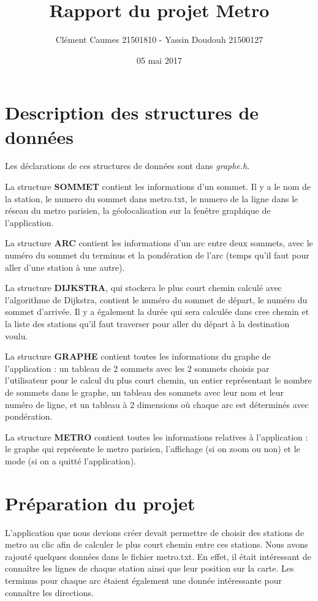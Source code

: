 \documentclass[a4]{article}
\author{Clément Caumes 21501810 - Yassin Doudouh 21500127}
\title{Rapport du projet Metro}
\date{05 mai 2017}
\begin{document}
\maketitle

\section{Description des structures de données}

Les déclarations de ces structures de données sont dans \textit{graphe.h}. \newline

La structure \textbf{SOMMET} contient les informations d'un sommet. Il y a le nom de la station, le numero du sommet dans metro.txt, le numero
de la ligne dans le réseau du metro parisien, la géolocalisation sur la fenêtre graphique de l'application.\newline

La structure \textbf{ARC} contient les informations d'un arc entre deux sommets, avec le numéro du sommet du terminus et la pondération de l'arc (temps qu'il faut pour aller d'une station à une autre).\newline

La structure \textbf{DIJKSTRA}, qui stockera le plus court chemin calculé avec l'algorithme de Dijkstra, contient le numéro du sommet de départ, le numéro du sommet d'arrivée. 
Il y a également la durée qui sera calculée dans cree chemin et la liste des stations qu'il faut traverser pour aller du départ à la destination voulu.\newline

La structure \textbf{GRAPHE} contient toutes les informations du graphe de l'application : un tableau de 2 sommets avec les 2 sommets choisis par l'utilisateur pour le calcul du plus court chemin, un entier représentant 
le nombre de sommets dans le graphe, un tableau des sommets avec leur nom et leur numéro de ligne, et un tableau à 2 dimensions où chaque arc est déterminés avec 
pondération.\newline

La structure \textbf{METRO} contient toutes les informations relatives à l'application : le graphe qui représente le metro parisien, l'affichage (si on zoom ou non) et 
le mode (si on a quitté l'application).

\section{Préparation du projet}
L'application que nous devions créer devait permettre de choisir des stations de metro au clic afin de calculer le plus court chemin entre ces stations.\newline
Nous avons rajouté quelques données dans le fichier metro.txt. En effet, il était intéressant de connaître les lignes de chaque station ainsi que leur position sur la carte. 
Les terminus pour chaque arc étaient également une donnée intéressante pour connaître les directions. 
\end{document}
